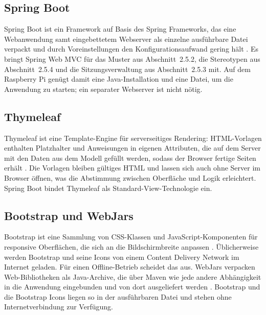\documentclass[12pt,a4paper]{scrreprt}
\begin{document}
\subsection{Spring Boot}
Spring Boot ist ein Framework auf Basis des Spring Frameworks, das eine Webanwendung samt eingebettetem Webserver als einzelne ausführbare Datei verpackt und durch Voreinstellungen den Konfigurationsaufwand gering hält \cite{springboot}. Es bringt Spring Web MVC für das Muster aus Abschnitt~2.5.2, die Stereotypen aus Abschnitt~2.5.4 und die Sitzungsverwaltung aus Abschnitt~2.5.3 mit. Auf dem Raspberry Pi genügt damit eine Java-Installation und eine Datei, um die Anwendung zu starten; ein separater Webserver ist nicht nötig.

\subsection{Thymeleaf}
Thymeleaf ist eine Template-Engine für serverseitiges Rendering: HTML-Vorlagen enthalten Platzhalter und Anweisungen in eigenen Attributen, die auf dem Server mit den Daten aus dem Modell gefüllt werden, sodass der Browser fertige Seiten erhält \cite{thymeleaf}. Die Vorlagen bleiben gültiges HTML und lassen sich auch ohne Server im Browser öffnen, was die Abstimmung zwischen Oberfläche und Logik erleichtert. Spring Boot bindet Thymeleaf als Standard-View-Technologie ein.

\subsection{Bootstrap und WebJars}
Bootstrap ist eine Sammlung von CSS-Klassen und JavaScript-Komponenten für responsive Oberflächen, die sich an die Bildschirmbreite anpassen \cite{bootstrapdocs}. Üblicherweise werden Bootstrap und seine Icons von einem Content Delivery Network im Internet geladen. Für einen Offline-Betrieb scheidet das aus. WebJars verpacken Web-Bibliotheken als Java-Archive, die über Maven wie jede andere Abhängigkeit in die Anwendung eingebunden und von dort ausgeliefert werden \cite{webjars}. Bootstrap und die Bootstrap Icons liegen so in der ausführbaren Datei und stehen ohne Internetverbindung zur Verfügung.
\end{document}
